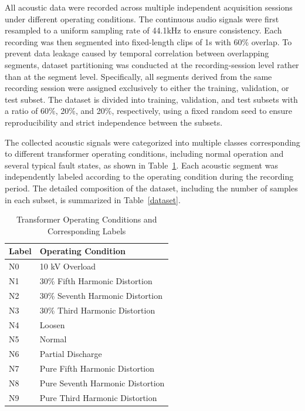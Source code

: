 \documentclass[anonymous]{iopjournal}
\begin{document}
All acoustic data were recorded across multiple independent acquisition sessions under different operating conditions. The continuous audio signals were first resampled to a uniform sampling rate of 44.1kHz to ensure consistency. Each recording was then segmented into fixed-length clips of 1s with 60\% overlap. To prevent data leakage caused by temporal correlation between overlapping segments, dataset partitioning was conducted at the recording-session level rather than at the segment level. Specifically, all segments derived from the same recording session were assigned exclusively to either the training, validation, or test subset. The dataset is divided into training, validation, and test subsets with a ratio of 60\%, 20\%, and 20\%, respectively, using a fixed random seed to ensure reproducibility and strict independence between the subsets.

The collected acoustic signals were categorized into multiple classes corresponding to different transformer operating conditions, including normal operation and several typical fault states, as shown in Table~\ref{tab:operating_conditions}. Each acoustic segment was independently labeled according to the operating condition during the recording period. The detailed composition of the dataset, including the number of samples in each subset, is summarized in Table~\ref{dataset}.


\begin{table}
	\caption{Transformer Operating Conditions and Corresponding Labels}
	\centering
	\begin{tabular}{ll}
		\toprule
		Label & Operating Condition \\
		\midrule
		N0 & 10 kV Overload \\
		N1 & 30\% Fifth Harmonic Distortion \\
		N2 & 30\% Seventh Harmonic Distortion \\
		N3 & 30\% Third Harmonic Distortion \\
		N4 & Loosen \\
		N5 & Normal \\
		N6 & Partial Discharge \\
		N7 & Pure Fifth Harmonic Distortion \\
		N8 & Pure Seventh Harmonic Distortion \\
		N9 & Pure Third Harmonic Distortion \\
		\bottomrule
	\end{tabular}
	\label{tab:operating_conditions}
\end{table}
\end{document}
